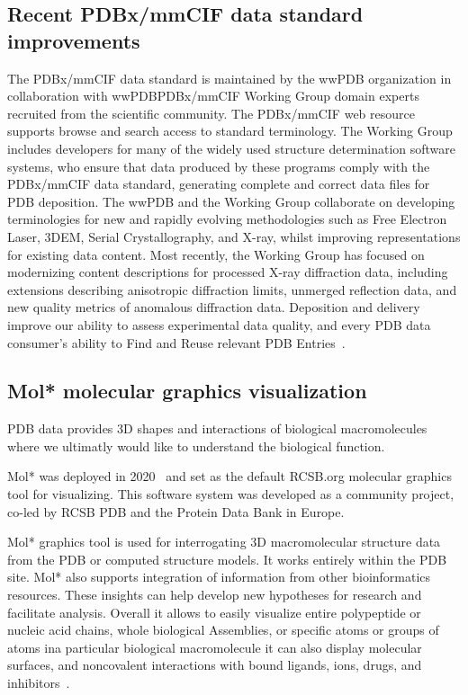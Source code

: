 \documentclass{report}
\begin{document}
\subsection*{Recent PDBx/mmCIF data standard improvements}

The PDBx/mmCIF data standard is maintained by the wwPDB organization in collaboration with wwPDBPDBx/mmCIF Working Group domain experts recruited from the scientific community. The PDBx/mmCIF web resource supports browse and search access to standard terminology. The Working Group includes developers for many of the widely used structure determination software systems, who ensure that data produced by these programs comply with the PDBx/mmCIF data standard, generating complete and correct data files for PDB deposition. The wwPDB and the Working Group collaborate on developing terminologies for new and rapidly evolving methodologies such as Free Electron Laser, 3DEM, Serial Crystallography, and X-ray, whilst improving representations for existing data content. Most recently, the Working Group has focused on modernizing content descriptions for processed X-ray diffraction data, including extensions describing anisotropic diffraction limits, unmerged reflection data, and new quality metrics of anomalous diffraction data. Deposition and delivery improve our ability to assess experimental data quality, and every PDB data consumer's ability to Find and Reuse relevant PDB Entries~\cite{burley_rcsb_2022}.

\subsection*{Mol* molecular graphics visualization}

PDB data provides 3D shapes and interactions of biological macromolecules where we ultimatly would like to understand the biological function. 

Mol* was deployed in 2020~\cite{sehnal_mol_2021} and set as the default RCSB.org molecular graphics tool for visualizing. This software system was developed as a community project, co-led by RCSB PDB and the Protein Data Bank in Europe. 

Mol* graphics tool is used for interrogating 3D macromolecular structure data from the PDB or computed structure models. It works entirely within the PDB site. Mol* also supports integration of information from other bioinformatics resources. These insights can help develop new hypotheses for research and facilitate analysis. Overall it allows to easily visualize entire polypeptide or nucleic acid chains, whole biological Assemblies, or specific atoms or groups of atoms ina particular biological macromolecule it can also display molecular surfaces, and noncovalent interactions with bound ligands, ions, drugs, and inhibitors~\cite{burley_rcsb_2022}.
\end{document}
